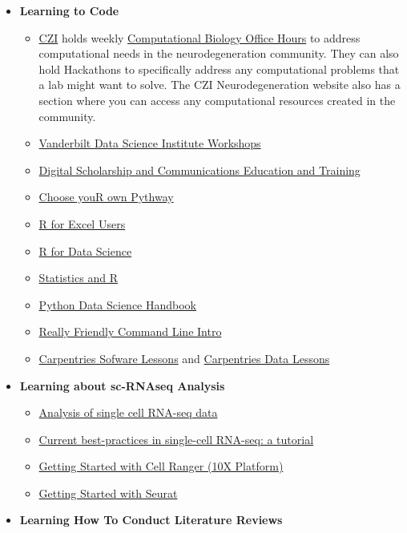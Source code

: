\documentclass[
]{book}
\begin{document}
\begin{itemize}
\item
  \textbf{Learning to Code}

  \begin{itemize}
  \item
    \href{https://chanzuckerberg.com/ndcn/member-login/?redirect_to=https://chanzuckerberg.com/ndcn/}{CZI} holds weekly \href{https://sifuentescj.gitbook.io/comp-bio-training/}{Computational Biology Office Hours} to address computational needs in the neurodegeneration community. They can also hold Hackathons to specifically address any computational problems that a lab might want to solve. The CZI Neurodegeneration website also has a section where you can access any computational resources created in the community.
  \item
    \href{https://www.vanderbilt.edu/datascience/events/data-science-workshops/}{Vanderbilt Data Science Institute Workshops}
  \item
    \href{https://www.library.vanderbilt.edu/disc/workshops.php}{Digital Scholarship and Communications Education and Training}
  \item
    \href{https://openscapes.github.io/cyop/}{Choose youR own Pythway}
  \item
    \href{https://rstudio-conf-2020.github.io/r-for-excel/}{R for Excel Users}
  \item
    \href{https://r4ds.had.co.nz/}{R for Data Science}
  \item
    \href{https://www.edx.org/course/statistics-and-r}{Statistics and R}
  \item
    \href{https://jakevdp.github.io/PythonDataScienceHandbook/}{Python Data Science Handbook}
  \item
    \href{https://hellowebbooks.com/learn-command-line/}{Really Friendly Command Line Intro}
  \item
    \href{https://software-carpentry.org/lessons/}{Carpentries Sofware Lessons} and \href{https://datacarpentry.org/lessons/}{Carpentries Data Lessons}
  \end{itemize}
\item
  \textbf{Learning about sc-RNAseq Analysis}

  \begin{itemize}
  \item
    \href{https://scrnaseq-course.cog.sanger.ac.uk/website/index.html}{Analysis of single cell RNA-seq data}
  \item
    \href{https://github.com/theislab/single-cell-tutorial}{Current best-practices in single-cell RNA-seq: a tutorial}
  \item
    \href{https://support.10xgenomics.com/single-cell-gene-expression/software/pipelines/latest/using/tutorial_ov}{Getting Started with Cell Ranger (10X Platform)}
  \item
    \href{https://satijalab.org/seurat/articles/get_started.html}{Getting Started with Seurat}
  \end{itemize}
\item
  \textbf{Learning How To Conduct Literature Reviews}


\end{itemize}
\end{document}
